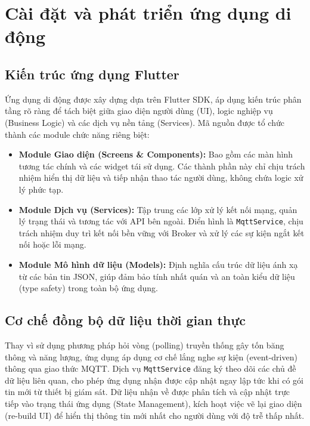 \section{Cài đặt và phát triển ứng dụng di động}

\subsection{Kiến trúc ứng dụng Flutter}
Ứng dụng di động được xây dựng dựa trên Flutter SDK, áp dụng kiến trúc phân tầng rõ ràng để tách biệt giữa giao diện người dùng (UI), logic nghiệp vụ (Business Logic) và các dịch vụ nền tảng (Services). Mã nguồn được tổ chức thành các module chức năng riêng biệt:
\begin{itemize}
    \item \textbf{Module Giao diện (Screens \& Components):} Bao gồm các màn hình tương tác chính và các widget tái sử dụng. Các thành phần này chỉ chịu trách nhiệm hiển thị dữ liệu và tiếp nhận thao tác người dùng, không chứa logic xử lý phức tạp.
    \item \textbf{Module Dịch vụ (Services):} Tập trung các lớp xử lý kết nối mạng, quản lý trạng thái và tương tác với API bên ngoài. Điển hình là \texttt{MqttService}, chịu trách nhiệm duy trì kết nối bền vững với Broker và xử lý các sự kiện ngắt kết nối hoặc lỗi mạng.
    \item \textbf{Module Mô hình dữ liệu (Models):} Định nghĩa cấu trúc dữ liệu ánh xạ từ các bản tin JSON, giúp đảm bảo tính nhất quán và an toàn kiểu dữ liệu (type safety) trong toàn bộ ứng dụng.
\end{itemize}

\subsection{Cơ chế đồng bộ dữ liệu thời gian thực}
Thay vì sử dụng phương pháp hỏi vòng (polling) truyền thống gây tốn băng thông và năng lượng, ứng dụng áp dụng cơ chế lắng nghe sự kiện (event-driven) thông qua giao thức MQTT. Dịch vụ \texttt{MqttService} đăng ký theo dõi các chủ đề dữ liệu liên quan, cho phép ứng dụng nhận được cập nhật ngay lập tức khi có gói tin mới từ thiết bị giám sát. Dữ liệu nhận về được phân tích và cập nhật trực tiếp vào trạng thái ứng dụng (State Management), kích hoạt việc vẽ lại giao diện (re-build UI) để hiển thị thông tin mới nhất cho người dùng với độ trễ thấp nhất.

